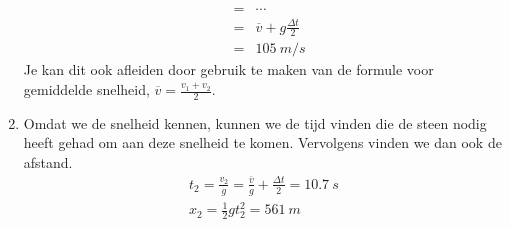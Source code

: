 \begin{oplossing}
\begin{enumerate}
\begin{eqnarray*}
&=&\cdots\\
&=&\overline{v}+g\frac{\Delta t}{2}\\
&=&\SI{105}{m/s}
\end{eqnarray*}
Je kan dit ook afleiden door gebruik te maken van de formule voor gemiddelde snelheid, $\overline{v}=\frac{v_1+v_2}{2}$.
\item Omdat we de snelheid kennen, kunnen we de tijd vinden die de steen nodig heeft gehad om aan deze snelheid te komen. Vervolgens vinden we dan ook de afstand.
\begin{eqnarray*}
t_2=\frac{v_2}{g}=\frac{\overline{v}}{g}+\frac{\Delta t}{2}=\SI{10,7}{s}\\
x_2=\frac{1}{2}gt_2^2=\SI{561}{m}
\end{eqnarray*}
\end{enumerate}
\end{oplossing}